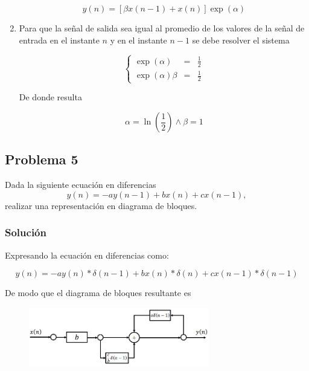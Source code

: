 \documentclass[a4paper,12pt,final]{article}
\begin{document}
\begin{enumerate}[label=\alph*)]
          $$y\left(n\right) = \left[\beta x\left(n-1\right) + x\left(n\right)\right]\exp\left(\alpha\right)$$

        \item Para que la señal de salida sea igual al promedio de los valores de la señal de entrada en el instante $n$
          y en el instante $n-1$ se debe resolver el sistema

          \begin{equation}
            \left\{
              \begin{array}{ccc}
                \exp\left(\alpha\right)      &=&  \displaystyle{\frac{1}{2}} \\[1em]
                \exp\left(\alpha\right)\beta &=&  \displaystyle{\frac{1}{2}}
              \end{array}
            \right.
          \end{equation}

          \noindent De donde resulta

          $$ \alpha = \ln\left(\frac{1}{2}\right) \wedge \beta = 1$$
      \end{enumerate}

  \newpage
  \subsection*{Problema 5}
    \noindent Dada la siguiente ecuación en diferencias
    $$y\left(n\right) = -a y\left(n-1\right) + b x\left(n\right) + c x\left(n-1\right),$$
    realizar una representación en diagrama de bloques.

    \subsubsection*{Solución}
      \noindent Expresando la ecuación en diferencias como:

      $$y\left(n\right) = -a y\left(n\right) * \delta\left(n-1\right) + b x\left(n\right) * \delta\left(n\right) + c x\left(n-1\right) * \delta\left(n-1\right)$$

      \noindent De modo que el diagrama de bloques resultante es

      \begin{figure}[H]
        \begin{center}
          \includegraphics[width=0.7\textwidth]{./laboratorio_3/problema05_diagram.png}
        \end{center}
      \end{figure}
\end{document}
